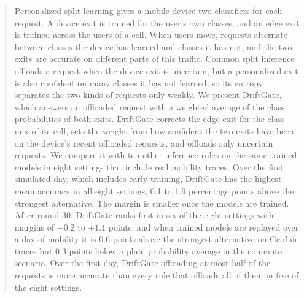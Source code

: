 \begin{abstract}
Personalized split learning gives a mobile device two classifiers for each request. A device exit is trained for the user's own classes, and an edge exit is trained across the users of a cell. When users move, requests alternate between classes the device has learned and classes it has not, and the two exits are accurate on different parts of this traffic. Common split inference offloads a request when the device exit is uncertain, but a personalized exit is also confident on many classes it has not learned, so its entropy separates the two kinds of requests only weakly. We present DriftGate, which answers an offloaded request with a weighted average of the class probabilities of both exits. DriftGate corrects the edge exit for the class mix of its cell, sets the weight from how confident the two exits have been on the device's recent offloaded requests, and offloads only uncertain requests. We compare it with ten other inference rules on the same trained models in eight settings that include real mobility traces. Over the first simulated day, which includes early training, DriftGate has the highest mean accuracy in all eight settings, 0.1 to 1.9 percentage points above the strongest alternative. The margin is smaller once the models are trained. After round 30, DriftGate ranks first in six of the eight settings with margins of $-0.2$ to $+1.1$ points, and when trained models are replayed over a day of mobility it is 0.6 points above the strongest alternative on GeoLife traces but 0.3 points below a plain probability average in the commute scenario. Over the first day, DriftGate offloading at most half of the requests is more accurate than every rule that offloads all of them in five of the eight settings. 
\end{abstract}
